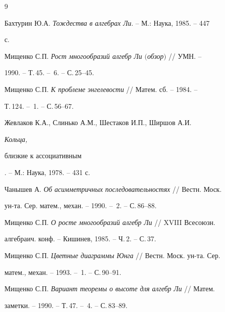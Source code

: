 \begin{thebibliography}{9}







Бахтурин Ю.А. {\em Тождества в алгебрах Ли}. -- М.: Наука, 1985. -- 447


с.




Мищенко С.П. {\em Рост многообразий алгебр Ли $($обзор$)$} // УМН. --


1990. -- Т.\,45. -- \No\,6. -- С.\,25--45.




Мищенко С.П. {\em К проблеме энгелевости} // Матем. сб. -- 1984. --


Т.\,124. -- \No\,1. -- С.\,56--67.




Жевлаков К.А., Слинько А.М., Шестаков И.П., Ширшов А.И. {\em Кольца,


близкие к ассоциативным}. -- М.: Наука, 1978. -- 431 с.




Чанышев А. {\em Об асимметричных последовательностях} // Вестн. Моск.


ун-та. Сер. матем., механ. -- 1990. -- \No\,2. -- С.\,86--88.




Мищенко С.П. {\em О росте многообразий алгебр Ли} // XVIII Всесоюзн.


алгебраич. конф. -- Кишинев, 1985. -- Ч.\,2. -- С.\,37.




Мищенко С.П. {\em Цветные диаграммы Юнга} // Вестн. Моск. ун-та. Сер.


матем., механ. -- 1993. -- \No\,1. -- С.\,90--91.




Мищенко С.П. {\em Вариант теоремы о высоте для алгебр Ли} // Матем.


заметки. -- 1990. -- Т.\,47. -- \No\,4. -- С.\,83--89.





\end{thebibliography}





\vskip 2cm














\label{end}





